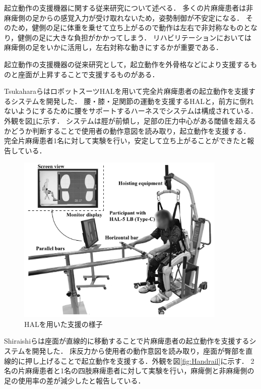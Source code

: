起立動作の支援機器に関する従来研究について述べる．
多くの片麻痺患者は非麻痺側の足からの感覚入力が受け取れないため，姿勢制御が不安定になる\cite{Chou2003}．
そのため，健側の足に体重を乗せて立ち上がるので動作は左右で非対称なものとなり，健側の足に大きな負担がかかってしまう．
リハビリテーションにおいては麻痺側の足をいかに活用し，左右対称な動きにするかが重要である．

起立動作の支援機器の従来研究として，起立動作を外骨格などにより支援するもの\cite{Tsukahara2010}と座面が上昇することで支援するもの\cite{Shiraishi2016}がある．

TsukaharaらはロボットスーツHALを用いて完全片麻痺患者の起立動作を支援するシステムを開発した．
腰・膝・足関節の運動を支援するHALと，前方に倒れないようにするために腰をサポートするハーネスでシステムは構成されている．外観を図\ref{fig:HAL}に示す．
システムは脛が前傾し，足部の圧力中心がある閾値を超えるかどうか判断することで使用者の動作意図を読み取り，起立動作を支援する．
完全片麻痺患者1名に対して実験を行い，安定して立ち上がることができたと報告している．

\begin{figure}[b]
	\begin{center}
		\includegraphics[width=10cm]{./Chap1/fig/HAL.PNG}
		\caption{HALを用いた支援の様子\cite{Tsukahara2010}}
		\label{fig:HAL}
	\end{center}
\end{figure}

Shiraishiらは座面が直線的に移動することで片麻痺患者の起立動作を支援するシステムを開発した．
床反力から使用者の動作意図を読み取り，座面が臀部を直線的に押し上げることで起立動作を支援する．外観を図\ref{fig:Handrail}に示す．
2名の片麻痺患者と1名の四肢麻痺患者に対して実験を行い，麻痺側と非麻痺側の足の使用率の差が減少したと報告している．

